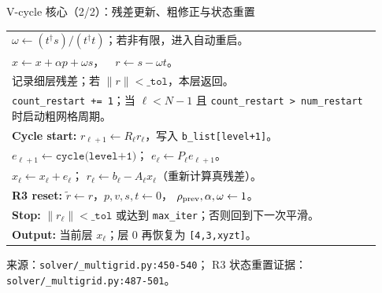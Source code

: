 \documentclass[UTF8,aspectratio=169,11pt]{ctexbeamer}
\newcommand{\source}[1]{%
  \vspace{0.06em}\par{\raggedright\scriptsize\color{muted}来源：#1\par}}
\newcommand{\pathref}[1]{\nolinkurl{#1}}
\begin{document}
\begin{frame}[t]{V-cycle 核心（2/2）：残差更新、粗修正与状态重置}
  \begin{center}
    \small
    \begin{tabular}{@{}p{0.93\linewidth}@{}}
      \toprule
      \quad $\omega\gets(t^\dagger s)/(t^\dagger t)$；若非有限，进入自动重启。
      \\
      \quad $x\gets x+\alpha p+\omega s$，$\quad r\gets s-\omega t$。
      \\
      \quad 记录细层残差；若 $\|r\|<\texttt{\_tol}$，本层返回。
      \\
      \quad \texttt{count\_restart += 1}；当 $\ell<N-1$ 且
      \texttt{count\_restart > num\_restart} 时启动粗网格周期。
      \\
      \textbf{Cycle start:}\quad
      $r_{\ell+1}\gets R_\ell r_\ell$，写入 \texttt{b\_list[level+1]}。
      \\
      \quad $e_{\ell+1}\gets\texttt{cycle(level+1)}$；
      $e_\ell\gets P_\ell e_{\ell+1}$。
      \\
      \quad $x_\ell\gets x_\ell+e_\ell$；
      $r_\ell\gets b_\ell-A_\ell x_\ell$（重新计算真残差）。
      \\
      \textbf{R3 reset:}\quad
      $\tilde r\gets r$，$p,v,s,t\gets0$，
      $\rho_{\rm prev},\alpha,\omega\gets1$。
      \\
      \textbf{Stop:}\quad
      $\|r_\ell\|<\texttt{\_tol}$ 或达到 \texttt{max\_iter}；否则回到下一次平滑。
      \\
      \textbf{Output:}\quad
      当前层 $x_\ell$；层 0 再恢复为 \texttt{[4,3,xyzt]}。
      \\
      \bottomrule
    \end{tabular}
  \end{center}
  \source{\pathref{solver/_multigrid.py:450-540}；
  R3 状态重置证据：\pathref{solver/_multigrid.py:487-501}。}
\end{frame}
\end{document}
